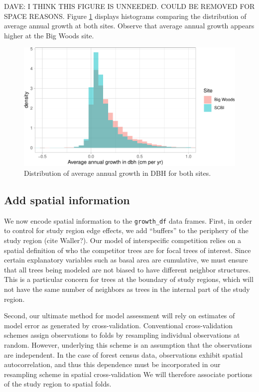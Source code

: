 \documentclass[12pt]{article}
\begin{document}
DAVE: I THINK THIS FIGURE IS UNNEEDED. COULD BE REMOVED FOR SPACE
REASONS. Figure \ref{fig:growth-histogram} displays histograms comparing
the distribution of average annual growth at both sites. Observe that
average annual growth appears higher at the Big Woods site.

\begin{figure}

{\centering \includegraphics[width=1\linewidth]{Figures/growth-histogram-1} 

}

\caption{Distribution of average annual growth in DBH for both sites.}\label{fig:growth-histogram}
\end{figure}

\hypertarget{spatial-information}{%
\subsection{Add spatial information}\label{spatial-information}}

We now encode spatial information to the \texttt{growth\_df} data
frames. First, in order to control for study region edge effects, we add
``buffers'' to the periphery of the study region (cite Waller?). Our
model of interspecific competition relies on a spatial definition of who
the competitor trees are for focal trees of interest. Since certain
explanatory variables such as basal area are cumulative, we must ensure
that all trees being modeled are not biased to have different neighbor
structures. This is a particular concern for trees at the boundary of
study regions, which will not have the same number of neighbors as trees
in the internal part of the study region.

Second, our ultimate method for model assessment will rely on estimates
of model error as generated by cross-validation. Conventional
cross-validation schemes assign observations to folds by resampling
individual observations at random. However, underlying this scheme is an
assumption that the observations are independent. In the case of forest
census data, observations exhibit spatial autocorrelation, and thus this
dependence must be incorporated in our resampling scheme in spatial
cross-validation \citet{roberts_cross-validation_2017}
\citet{pohjankukka_estimating_2017} We will therefore associate portions
of the study region to spatial folds.
\end{document}
